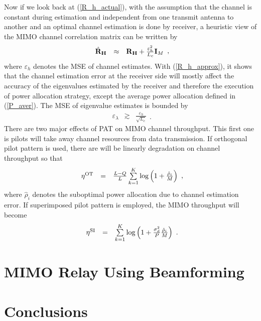 \documentclass[10pt,fleqn, twocolumn]{IEEEtran}
\newcommand{\bH}{{\bf H}}
\newcommand{\bI}{{\bf I}}
\newcommand{\bR}{{\bf R}}
\begin{document}
Now if we look back at (\ref{R_h_actual}), with the assumption
that the channel is constant during estimation and independent
from one transmit antenna to another and an optimal channel
estimation is done by receiver, a heuristic view of the MIMO
channel correlation matrix can be written by
\begin{equation}
\begin{array}{rcl}
\hat{\bR}_{\bH}&\approx&\bR_{\bH}+\frac{\varepsilon_{h}^2}{L_{c}}\bI_{M}
\end{array},\label{R_h_approx}
\end{equation}
\noindent where $\varepsilon_{h}$ denotes the MSE of channel
estimates. With (\ref{R_h_approx}), it shows that the channel
estimation error at the receiver side will mostly affect the
accuracy of the eigenvalues estimated by the receiver and
therefore the execution of power allocation strategy, except the
average power allocation defined in (\ref{P_aver}). The MSE of
eigenvalue estimates is bounded by
\begin{equation}
\begin{array}{rcl}
\varepsilon_{\lambda}&\gtrsim&\frac{\varepsilon_{h}}{\sqrt{L_{c}}}
\end{array}.\label{eigenvalue_bound}
\end{equation}
There are two major effects of PAT on MIMO channel throughput.
This first one is pilots will take away channel resources from
data transmission.  If orthogonal pilot pattern is used, there are
will be linearly degradation on channel throughput so that
\begin{equation}%
\begin{array}{rcl}
\eta^{\rm OT}& =&\frac{L-Q}{L}
\sum\limits_{k=1}^{K}\log\left(1+\frac{\hat{\rho}_{i}}{M}\right)
\end{array},\label{spectral_eff_OT}
\end{equation}
\noindent where $\hat{\rho}_{i}$ denotes the suboptimal power
allocation due to channel estimation error. If superimposed pilot
pattern is employed, the MIMO throughput will become
\begin{equation}%
\begin{array}{rcl}
\eta^{\rm
SI}&=&\sum\limits_{k=1}^{K}\log\left(1+\frac{\sigma_{d}^{2}}{P}\frac{\hat{\rho}_{i}}{M}\right)
\end{array}.\label{spectral_eff_SI}
\end{equation}
\section{MIMO Relay Using Beamforming}
\section{Conclusions}

\small


\end{document}
